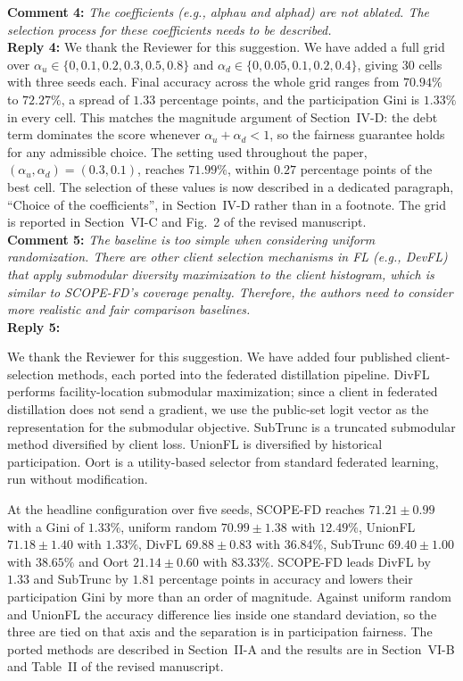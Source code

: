 \documentclass[10pt]{article}
\begin{document}
\noindent
\textbf{Comment 4:} \textit{The coefficients (e.g., alphau and alphad) are not ablated. The selection process for these coefficients needs to be described.} \\
\noindent
\textbf{Reply 4:} {We thank the Reviewer for this suggestion. We have added a full grid over $\alpha_u \in \{0, 0.1, 0.2, 0.3, 0.5, 0.8\}$ and $\alpha_d \in \{0, 0.05, 0.1, 0.2, 0.4\}$, giving $30$ cells with three seeds each. Final accuracy across the whole grid ranges from $70.94\%$ to $72.27\%$, a spread of $1.33$ percentage points, and the participation Gini is $1.33\%$ in every cell. This matches the magnitude argument of Section~IV-D: the debt term dominates the score whenever $\alpha_u + \alpha_d < 1$, so the fairness guarantee holds for any admissible choice. The setting used throughout the paper, $(\alpha_u, \alpha_d) = (0.3, 0.1)$, reaches $71.99\%$, within $0.27$ percentage points of the best cell. The selection of these values is now described in a dedicated paragraph, ``Choice of the coefficients'', in Section~IV-D rather than in a footnote. The grid is reported in Section~VI-C and Fig.~2 of the revised manuscript.}\\

\noindent
\textbf{Comment 5:} \textit{The baseline is too simple when considering uniform randomization. There are other client selection mechanisms in FL (e.g., DevFL) that apply submodular diversity maximization to the client histogram, which is similar to SCOPE-FD's coverage penalty. Therefore, the authors need to consider more realistic and fair comparison baselines.} \\
\noindent
\textbf{Reply 5:} {We thank the Reviewer for this suggestion. We have added four published client-selection methods, each ported into the federated distillation pipeline. DivFL performs facility-location submodular maximization; since a client in federated distillation does not send a gradient, we use the public-set logit vector as the representation for the submodular objective. SubTrunc is a truncated submodular method diversified by client loss. UnionFL is diversified by historical participation. Oort is a utility-based selector from standard federated learning, run without modification.

At the headline configuration over five seeds, SCOPE-FD reaches $71.21 \pm 0.99$ with a Gini of $1.33\%$, uniform random $70.99 \pm 1.38$ with $12.49\%$, UnionFL $71.18 \pm 1.40$ with $1.33\%$, DivFL $69.88 \pm 0.83$ with $36.84\%$, SubTrunc $69.40 \pm 1.00$ with $38.65\%$ and Oort $21.14 \pm 0.60$ with $83.33\%$. SCOPE-FD leads DivFL by $1.33$ and SubTrunc by $1.81$ percentage points in accuracy and lowers their participation Gini by more than an order of magnitude. Against uniform random and UnionFL the accuracy difference lies inside one standard deviation, so the three are tied on that axis and the separation is in participation fairness. The ported methods are described in Section~II-A and the results are in Section~VI-B and Table~II of the revised manuscript.}\\
\end{document}
